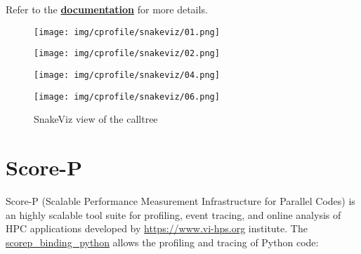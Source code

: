 \documentclass[a4paper,pagesize,12pt]{scrbook}
\begin{document}
Refer to
the \href{https://jiffyclub.github.io/snakeviz/#interpreting-results}{\textbf{documentation}} for
more details.

\begin{figure}[ht]
\centering
    \caption{SnakeViz view of the calltree}
    \label{snake}
\begin{minipage}[c]{\textwidth}
\captionsetup{labelformat=empty} \centering
    \texttt{[image: img/cprofile/snakeviz/01.png]}
\end{minipage}
\noindent
\begin{minipage}[c]{\textwidth}
\captionsetup{labelformat=empty} \centering
    \texttt{[image: img/cprofile/snakeviz/02.png]}
\end{minipage}
\noindent
\begin{minipage}[c]{\textwidth}
\captionsetup{labelformat=empty} \centering
    \texttt{[image: img/cprofile/snakeviz/04.png]}
\end{minipage}
\noindent
\begin{minipage}[c]{\textwidth}
\captionsetup{labelformat=empty} \centering
    \texttt{[image: img/cprofile/snakeviz/06.png]}
\end{minipage}
\end{figure}




\newpage
\section{Score-P}
Score-P (Scalable Performance Measurement Infrastructure for Parallel Codes) is
an highly scalable tool suite for profiling, event tracing, and online
analysis of HPC applications developed by \url{https://www.vi-hps.org} institute.
The \href{https://github.com/score-p/scorep_binding_python}{scorep\_binding\_python}
allows the profiling and tracing of Python code:
\end{document}
